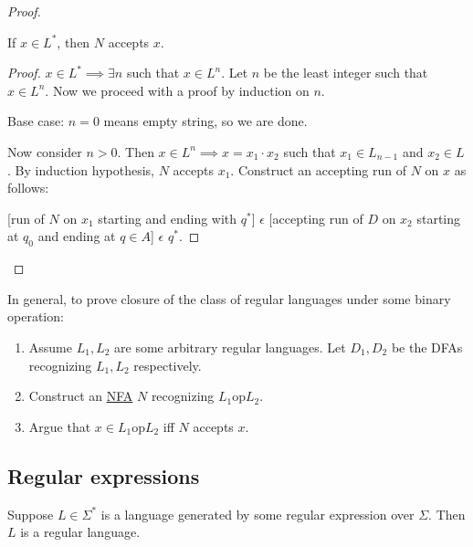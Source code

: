 \documentclass[a4paper]{article}
\begin{document}
\begin{proof}
    \begin{claim}
        If $x \in L^*$, then $N$ accepts $x$.
    \end{claim}

    \begin{proof}
        $x \in L^* \implies \exists n$ such that $x \in L^n$. Let $n$ be the least integer such that $x \in L^n$. Now we proceed with a proof by induction on $n$.

        Base case: $n = 0$ means empty string, so we are done.

        Now consider $n > 0$. Then $x \in L^n \implies x = x_1 \cdot x_2$ such that $x_1 \in L_{n-1}$ and $x_2 \in L$. By induction hypothesis, $N$ accepts $x_1$. Construct an accepting run
        of $N$ on $x$ as follows:

        [run of $N$ on $x_1$ starting and ending with $q^*$] $\epsilon$ [accepting run of $D$ on $x_2$ starting at $q_0$ and ending at $q \in A$] $\epsilon$ $q^*$.
    \end{proof}

\end{proof}

\begin{note}
    In general, to prove closure of the class of regular languages under some binary operation:
    \begin{enumerate}
        \item Assume $L_1, L_2$ are some arbitrary regular languages. Let $D_1, D_2$ be the DFAs recognizing $L_1, L_2$ respectively.
        \item Construct an \underline{NFA} $N$ recognizing $L_1 \mathrm{op} L_2$.
        \item Argue that $x \in L_1 \mathrm{op} L_2$ iff $N$ accepts $x$.
    \end{enumerate}
\end{note}

\subsection{Regular expressions}

\begin{theorem}
    Suppose $L \in \Sigma^*$ is a language generated by some regular expression over $\Sigma$. Then $L$ is a regular language.
\end{theorem}
\end{document}
